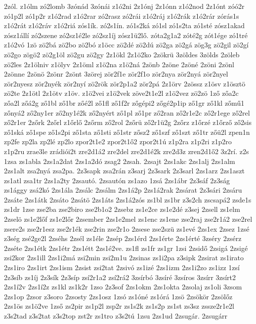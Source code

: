 {2zól.
z1ólm
zó2lomb
3zónád
3zónái
z1ó2ni
2z1ónj
2z1ónn
z1ó2nod
2z1ónt
zóó2r
zó1p2l
zó1p2r
z1ó2rad
z1ó2rar
zó2rasz
zó2rái
z1ó2ráj
z1ó2rák
z1ó2rár
zórás1s
z1ó2rát
z1ó2ráv
z1ó2riá
zós1ík.
zó2s1ín.
zó1s2ká
zó1sl
zó1s2ta
zó1sté
zósz1akad
zósz1állí
zó2szene
zó2sz1é2le
zó2sz1íj
zósz1ü2lő.
zóta2g1a2
zóté2g
zót1ége
zó1tré
z1ó2vó
1zö
zö2bá
zö2bo
zö2bó
z1öcc
zö2dé
zö2dú
zö2ga
zö2gá
zög3g
zö2gil
zö2gí
zö2go
zögö2
zö2g1öl
zö2gu
zö2gy
2z1ökl
2z1ö2ko
2zökrü
3zöldes
3zölds
2zöleb
zö2les
2z1ölniv
z1ölyv
2z1öml
z1ö2na
z1ö2ná
2zönb
2zöne
2zöné
2zöni
2zönl
2zönne
2zönö
2zönr
2zönt
3zörej
zör2f1e
zör2f1o
zör2nya
zör2nyá
zör2nyel
zör2nyesz
zör2nyék
zör2nyí
zö2rök
zör2p1a2
zör2pá
2z1örv
2zössz
z1ösv
z1ösztö
zö2te
2z1ötl
2z1ötv
z1öv.
z1ö2vei
z1ö2vek
zöve2t1e2l
z1ö2vez
zö2zö
1ző
zőa2c
zőa2l
zőá2g
ző1bl
ző1br
zőé2l
ző1fl
ző1f2r
zőgépi2
zőgé2p1ip
ző1gr
ző1kl
zőmű1
zőnyá2
ző2ny1er
ző2ny1é2k
ző2nyért
ző1pl
ző1pr
ző2ran
ző2r1e2c
ző2r1ege
ző2rel
ző2r1er
2zőrk
2zőrl
z1őrlő
2zőrm
ző2rol
2zőrü
ző2r1ü2g
2zőrz
z1őrzé
z1őrző
ző2sis
ző1ská
ző1spe
ző1s2pi
ző1sta
ző1sti
ző1str
zősz2
ző1szf
ző1szt
ző1tr
zőü2l
zpen1n
zp2fe
zp2la
zp2lé
zp2lo
zpor2t1e2
zpor2t1ő2
zpor2t1ú
z1p2ra
z1p2ri
z1p2ro
z1p2ru
zrae3le
zrádiói2t
zre2d1á2
zre2del
zre2d1é2k
zre2d3z
zren2d1ő2
3z2rí.
z2s
1zsa
zs1abla
2zs1a2dat
2zs1a2dó
zsag2
2zsah.
2zsajt
2zs1akc
2zs1alj
2zs1alm
2zs1alt
zsa2nyá
zsa2pa.
2z3sapk
zsa2rán
z3sarj
2z3sark
2z3sarl
2zs1arz
2zs1aszt
zs1atl
zsa1tr
2zs1a2ty
2zsautó.
2zsautón
zs1azo
1zsá
2zs1ábr
2z3sáf
2z3ság
zs1ággy
zsá2kó
2zs1ála
2zsálc
2zsálm
2zs1á2p
2zs1á2rak
2zsárat
2z3sári
2zsáru
2zsáte
2zs1átk
2zsáto
2zsátö
2zs1áts
2zs1á2zós
zs1bl
zs1br
z3s2ch
zscsapá2
zsde1s
zs1dr
1zse
zse2ba
zse2biro
zse2b1o2
2zsebz
zs1e2ce
zs1e2dé
z3sej
2zsell
zs1elm
2zselö
zs1e2lőf
zs1e2lőr
2zsember
2zs1e2mel
zs1enc
zs1ene
zse2raj
zse2r1á2
zse2rel
zsere2s
zse2r1esz
zse2r1ék
zse2rin
zse2r1o
2zsese
zse2szü
zs1evé
2zs1ex
2zsez
1zsé
z3ség
zsé2ge2l
2zséhs
2zsél
zs1éle
2zsép
2zs1érd
2zs1érte
2zs1érté
3zséry
2zsérz
2zséte
2zs1étk
2zs1étr
2zs1étt
2zs1é2ve.
zs1fl
zs1fr
zs1gr
1zsi
2zsidő
2zsigá
2zsigé
zsi2kor
2zs1ill
2zs1i2má
zsi2min
zsi2m1u
2zsinas
zs1i2pa
z3sipk
2zsirat
zs1irato
2zs1iro
2zs1irt
2zs1ism
2zsist
zsi2tat
2zsivó
zs1izé
2zs1izm
2zs1i2zo
zs1izz
1zsí
2z3síb
zs1íj
2z3sík
2z3síp
zsí2r1a2
zsí2rá2
3zsírbó
3zsíré
3zsíros
3zsírr
3zsírt2
2zs1í2v
2zs1í2z
zs1kl
zs1k2r
1zso
2z3sof
2zs1okm
2zs1okta
2zsolaj
zs1oli
3zsom
2zs1op
2zsor
z3soro
2zsosty
2zs1osz
1zsó
zs1óné
zs1órá
1zsö
2zsökör
2zsölőz
2zs1ös
zs1ö2ve
1zső
zs2pir
zs1p2l
zsp2r
zs1s2k
zs1s2p
zs1st
zs3sz
zssze2r1e2l
z3s2tad
z3s2tat
z3s2top
zst2r
zs1tro
z3s2tú
1zsu
2zs1ud
2zsugár.
2zsugárr
}
